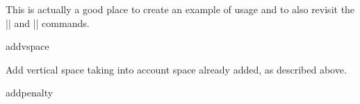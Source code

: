This is actually a good place to create an example of usage and to also revisit the |\lastskip| and |\unskip| commands.


%
% 
  \begin{docCommand}{addvspace}{}
  \end{docCommand}
  Add vertical space taking into account space already added, as
  described above.
    \begin{teX}
\def\addvspace#1{%
  \ifvmode
     \if@minipage\else
       \ifdim \lastskip =\z@
         \vskip #1\relax
       \else
       \@tempskipb#1\relax
         \@xaddvskip
       \fi
     \fi
  \else
    \@noitemerr
  \fi}
    \end{teX}
  
%
  \begin{docCommand}{addpenalty}{}
  \end{docCommand}  
    \begin{teX}
\def\addpenalty#1{%
  \ifvmode
    \if@minipage
    \else
      \if@nobreak
      \else
        \ifdim\lastskip=\z@
          \penalty#1\relax
        \else
          \@tempskipb\lastskip
          \vskip -\lastskip
          \penalty#1%
          \vskip\@tempskipb
        \fi
      \fi
    \fi
  \else
    \@noitemerr
  \fi}
    \end{teX}

